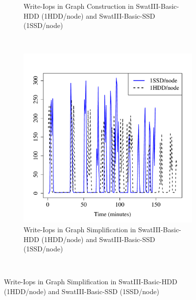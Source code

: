 \documentclass[conference]{IEEEtran}
\begin{document}
\begin{figure}[htb]
\begin{subfigure}[b]{0.23\textwidth}
                \caption{Write-Iops in Graph Construction in SwatIII-Basic-HDD (1HDD/node) and SwatIII-Basic-SSD (1SSD/node)}
                \label{fig:BGHddSsdWrIops}
        \end{subfigure}
        ~ %
        \begin{subfigure}[b]{0.23\textwidth}
                \includegraphics[width=\textwidth]{Figure/SystemData/Plots/ECHddSsdWrIops.pdf}
                \caption{Write-Iops in Graph Simplification in SwatIII-Basic-HDD (1HDD/node) and SwatIII-Basic-SSD (1SSD/node)}
                \label{fig:ECHddSsdWrIops}
        \end{subfigure}
        ~ %

\end{figure}
\end{document}
